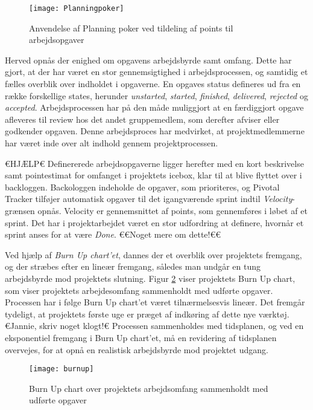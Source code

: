 	\begin{figure}[htb]
	\centering
	\texttt{[image: Planningpoker]}
	\caption{Anvendelse af Planning poker ved tildeling af points til arbejdsopgaver}
	\label{fig:planningpoker}	
	\end{figure}
	
	Herved opnås der enighed om opgavens arbejdsbyrde samt omfang. Dette har gjort, at der har været en stor gennemsigtighed i arbejdsprocessen, og samtidig et fælles overblik over indholdet i opgaverne. En opgaves status defineres ud fra en række forskellige states, herunder \textit{unstarted}, \textit{started}, \textit{finished}, \textit{delivered}, \textit{rejected} og \textit{accepted}. Arbejdsprocessen har på den måde muliggjort at en færdiggjort opgave afleveres til review hos det andet gruppemedlem, som derefter afviser eller godkender opgaven. Denne arbejdsproces har medvirket, at projektmedlemmerne har været inde over alt indhold gennem projektprocessen.  
    
    €HJÆLP€ 
	Definererede arbejdsopgaverne ligger herefter med en kort beskrivelse samt pointestimat for omfanget i projektets icebox, klar til at blive flyttet over i backloggen. Backologgen indeholde de opgaver, som prioriteres, og Pivotal Tracker tilføjer automatisk opgaver til det igangværende sprint indtil \textit{Velocity}-grænsen opnås. Velocity er gennemsnittet af points, som gennemføres i løbet af et sprint. Det har i projektarbejdet været en stor udfordring at definere, hvornår et sprint anses for at være \textit{Done}. €€Noget mere om dette!€€    
	
	Ved hjælp af \textit{Burn Up chart'et}, dannes der et overblik over projektets fremgang, og der stræbes efter en lineær fremgang, således man undgår en tung arbejdsbyrde mod projektets slutning. Figur \ref{fig:burnup} viser projektets Burn Up chart, som viser projektets arbejdesomfang sammenholdt med udførte opgaver. Processen har i følge Burn Up chart'et været tilnærmelsesvis lineær. Det fremgår tydeligt, at projektets første uge er præget af indkøring af dette nye værktøj. €Jannie, skriv noget klogt!€
	Processen sammenholdes med tidsplanen, og ved en eksponentiel fremgang i Burn Up chart'et, må en revidering af tidsplanen overvejes, for at opnå en realistisk arbejdsbyrde mod projektet udgang.  
		
	\begin{figure}[htb]
	\centering
	\texttt{[image: burnup]}
	\caption{Burn Up chart over projektets arbejdsomfang sammenholdt med udførte opgaver}
	\label{fig:burnup}	
	\end{figure}
	    	
